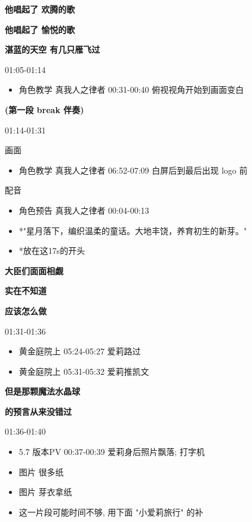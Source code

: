 \documentclass[a4paper]{article}
\begin{document}
\textbf{他唱起了 欢腾的歌}

\textbf{他唱起了 愉悦的歌}

\textbf{湛蓝的天空 有几只雁飞过}

01:05-01:14

\begin{itemize}
    \item 角色教学 真我人之律者 00:31-00:40 俯视视角开始到画面变白
\end{itemize}

\textbf{(第一段 break 伴奏)}

01:14-01:31

画面

\begin{itemize}
    \item 角色教学 真我人之律者 06:52-07:09 白屏后到最后出现 logo 前
\end{itemize}

配音

\begin{itemize}
    \item 角色预告 真我人之律者 00:04-00:13
    \item *"星月落下，编织温柔的童话。大地丰饶，养育初生的新芽。"
    \item *放在这17s的开头
\end{itemize}

\textbf{大臣们面面相觑}

\textbf{实在不知道}

\textbf{应该怎么做}

01:31-01:36

\begin{itemize}
    \item 黄金庭院上 05:24-05:27 爱莉路过
    \item 黄金庭院上 05:31-05:32 爱莉推凯文
\end{itemize}

\textbf{但是那颗魔法水晶球}

\textbf{的预言从来没错过}

01:36-01:40

\begin{itemize}
    \item 5.7 版本PV 00:37-00:39 爱莉身后照片飘落; 打字机
    \item 图片 很多纸
    \item 图片 芽衣拿纸
    \item 这一片段可能时间不够, 用下面 "小爱莉旅行" 的补
\end{itemize}
\end{document}
